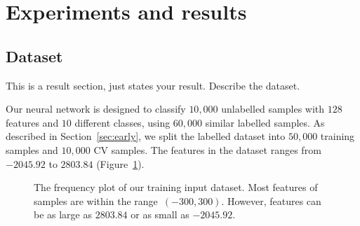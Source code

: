 \section{Experiments and results}\label{chapter4}

\subsection{Dataset}

This is a result section, just states your result. Describe the dataset.

Our neural network is designed to classify $10,000$ unlabelled samples with $128$ features and $10$ different classes, using $60,000$ similar labelled samples. As described in Section~\ref{sec:early}, we split the labelled dataset into $50,000$ training samples and $10,000$ CV samples. The features in the dataset ranges from $-2045.92$ to $2803.84$ (Figure~\ref{fig:freq-hist}).

\begin{figure}
    \caption{The frequency plot of our training input dataset. Most features of samples are within the range~$(-300,300)$. However, features can be as large as $2803.84$ or as small as $-2045.92$.}
    \label{fig:freq-hist}
\end{figure}

